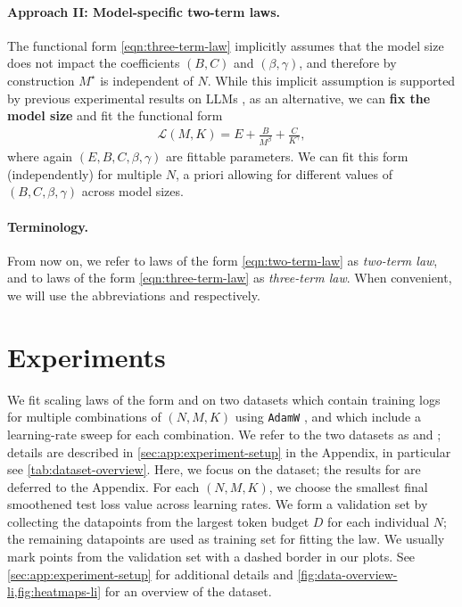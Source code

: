 \documentclass[12pt,a4paper,twoside]{article}
\begin{document}
\paragraph{Approach II: Model-specific two-term laws.}
The functional form \eqref{eqn:three-term-law} implicitly assumes that the model size does not impact the coefficients $(B,C)$ and $(\beta, \gamma)$, and therefore by construction $M^\star$ is independent of $N$.
While this implicit assumption is supported by previous experimental results on LLMs \citep{Li2025,Zhang2025}, as an alternative, we can \textbf{fix the model size} and fit the functional form 
\begin{align}\label{eqn:two-term-law}
    \mathcal{L}(M,K) = E + \frac{B}{M^\beta} + \frac{C}{K^\gamma},
\end{align}
where again $(E,B,C,\beta,\gamma)$ are fittable parameters. We can fit this form (independently) for multiple $N$,  a priori allowing for different values of $(B, C, \beta,\gamma)$ across model sizes.

\paragraph{Terminology.} From now on, we refer to laws of the form \eqref{eqn:two-term-law} as \emph{two-term law}, and to laws of the form \eqref{eqn:three-term-law} as \emph{three-term law}. When convenient, we will use the abbreviations \ttl{} and \tttl{} respectively.



\section{Experiments}

We fit scaling laws of the form \ttl{} and \tttl{} on two datasets which contain training logs for multiple combinations of $(N,M,K)$  using \texttt{AdamW} \citep{Loshchilov2019}, and which include a learning-rate sweep for each combination. We refer to the two datasets as \li{} and \oellm{}; details are described in \cref{sec:app:experiment-setup} in the Appendix, in particular see \cref{tab:dataset-overview}. Here, we focus on the \li{} dataset; the results for \oellm{} are deferred to the Appendix. For each $(N,M,K)$, we choose the smallest final smoothened test loss value across learning rates. We form a validation set by collecting the datapoints from the largest token budget $D$ for each individual $N$; the remaining datapoints are used as training set for fitting the law. We usually mark points from the validation set with a dashed border in our plots. 
See \cref{sec:app:experiment-setup} for additional details and \cref{fig:data-overview-li,fig:heatmaps-li} for an overview of the \li{} dataset. 
\end{document}
